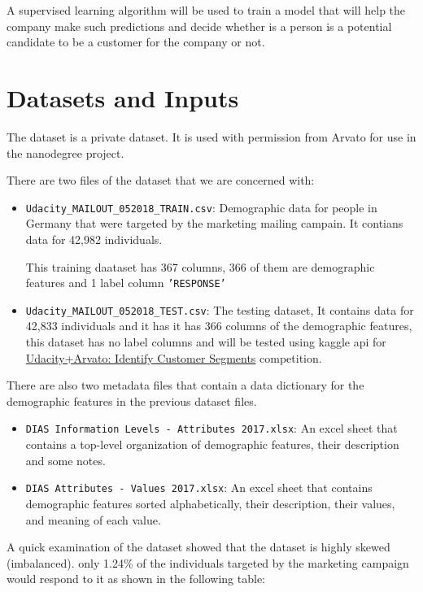 \documentclass[a4paper]{article}
\begin{document}
A supervised learning algorithm will be used to train a model that will help the company make such predictions and decide whether is a person is a potential candidate to be a customer for the company or not.

\section{Datasets and Inputs}
\label{sec:datasets-inputs}
The dataset is a private dataset. It is used with permission from Arvato for use in the nanodegree project.

There are two files of the dataset that we are concerned with:
\begin{itemize}
\item \texttt{Udacity\_MAILOUT\_052018\_TRAIN.csv}: Demographic data for people in Germany that were targeted by the marketing mailing campain. It contians data for 42,982 individuals.

  This training daataset has 367 columns, 366 of them are demographic features and 1 label column \texttt{'RESPONSE'}
\item \texttt{Udacity\_MAILOUT\_052018\_TEST.csv}: The testing dataset, It contains data for 42,833 individuals and it has it has 366 columns of the demographic features, this dataset has no label columns and will be tested using kaggle api for \href{https://www.kaggle.com/c/udacity-arvato-identify-customers/data}{Udacity+Arvato: Identify Customer Segments} competition.
\end{itemize}

There are also two metadata files that contain a data dictionary for the demographic features in the previous dataset files.

\begin{itemize}
\item \texttt{DIAS Information Levels - Attributes 2017.xlsx}: An excel sheet that contains a top-level organization of demographic features, their description and some notes.
\item \texttt{DIAS Attributes - Values 2017.xlsx}: An excel sheet that contains demographic features sorted alphabetically, their description, their values, and meaning of each value.
\end{itemize}

\pagebreak
A quick examination of the dataset showed that the dataset is highly skewed (imbalanced). only 1.24\% of the individuals targeted by the marketing campaign would respond to it as shown in the following table:
\end{document}

